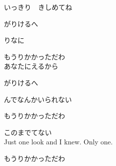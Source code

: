{いっきり　きしめてね

がりけるへ

りなに　

もうりかかっただわ
\\

あなたにえるから

がりけるへ

んでなんかいられない　

もうりかかっただわ

このまでてない
\\

Just one look and I knew. Only one.

もうりかかっただわ

}